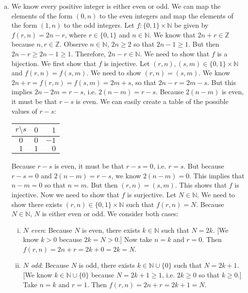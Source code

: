 \documentclass[11pt,letterpaper]{article}
\begin{document}
\begin{enumerate}[(a)]
\item We know every positive integer is either even or odd. We can map the elements of the form $(0, n)$ to the even integers and map the elements of the form $(1, n)$ to the odd integers. Let $f: \{ 0, 1 \} \times \mathbb{N}$ be given by $f(r, n)= 2n - r$, where $r \in \{ 0, 1 \}$ and $n \in \mathbb{N}$. We know that $2n + r \in \mathbb{Z}$ because $n, r \in \mathbb{Z}$. Observe $n \in \mathbb{N}$, $2n \geq 2$ so that $2n - 1 \geq 1$. But then $2n - r \geq 2n - 1 \geq 1$. Therefore, $2n - r \in \mathbb{N}$. We need to show that $f$ is a bijection. We first show that $f$ is injective. Let $(r, n), (s, m) \in \{ 0, 1 \} \times \mathbb{N}$ and $f(r, n)= f(s, m)$. We need to show $(r, n)= (s, m)$. We know $2n + r= f(r, n)= f(s, m)= 2m + s$, so that $2n - r= 2m - s$. But this implies $2n - 2m= r - s$, i.e. $2(n - m)= r - s$. Because $2(n - m)$ is even, it must be that $r - s$ is even. We can easily create a table of the possible values of $r - s$: \par
	\begin{table}[ht]
	\centering
	\begin{tabular}{c|rr}
	$r \setminus s$ & $0$ & $1$ \\ \hline
	$0$ & $0$ & $-1$ \\
	$1$ & $1$ & $0$
	\end{tabular}
	\end{table} \par
Because $r- s$ is even, it must be that $r - s= 0$, i.e. $r= s$. But because $r - s= 0$ and $2(n - m)= r - s$, we know $2(n - m)= 0$. This implies that $n - m= 0$ so that $n= m$. But then $(r, n)= (s, m)$. This shows that $f$ is injective. Now we need to show that $f$ is surjective. Let $N \in \mathbb{N}$. We need to show there exists $(r, n) \in \{ 0, 1 \} \times \mathbb{N}$ such that $f(r, n)= N$. Because $N \in \mathbb{N}$, $N$ is either even or odd. We consider both cases:
	\begin{enumerate}[(i)]
	\item {\itshape $N$ even}: Because $N$ is even, there exists $k \in \mathbb{N}$ such that $N= 2k$. [We know $k > 0$ because $2k= N > 0$.] Now take $n= k$ and $r= 0$. Then $f(r, n)= 2n + r= 2k + 0= 2k= N$. 
	\item {\itshape $N$ odd}: Because $N$ is odd, there exists $k \in \mathbb{N} \cup \{ 0 \}$ such that $N= 2k + 1$. [We know $k \in \mathbb{N} \cup \{ 0 \}$ because $N= 2k + 1 \geq 1$, i.e. $2k \geq 0$ so that $k \geq 0$.] Take $n= k$ and $r= 1$. Then $f(r, n)= 2n + r= 2k + 1= N$. 

\end{enumerate}
\end{enumerate}
\end{document}
